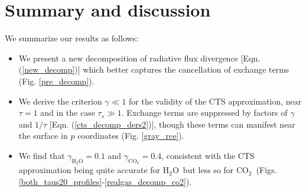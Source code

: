 \documentclass{ametsoc}
\newcommand{\eqnref}[1]{(\ref{#1})}
\newcommand{\cotwo}{\ensuremath{\mathrm{CO_2}}}
\newcommand{\htwo}{\ensuremath{\mathrm{H_2O}}}
\newcommand{\ch}{\ensuremath{\mathcal{H}}}
\newcommand{\chk}{\ensuremath{\ch_k}}
\newcommand{\tauk}{\ensuremath{\tau_k}}
\newcommand{\taus}{\ensuremath{\tau_s}}
\begin{document}

\section{Summary and discussion} \label{sec_summary}
We summarize our results as follows:
\begin{itemize}
	\item We present a new decomposition of radiative flux divergence [Eqn. \eqnref{new_decomp}] which better captures the cancellation of exchange terms (Fig. \ref{pre_decomp}).
	\item We derive the criterion $\gamma \ll 1$ for the validity of the CTS approximation, near $\tau=1$ and in the case $\taus \gg 1$. Exchange terms are suppressed by factors of $\gamma$ and $1/\tau$ [Eqn. \eqnref{cts_decomp_ders2}], though these terms can manifest near the surface in $p$ coordinates (Fig. \ref{gray_rce}).
	\item  We find that  $\gamma_{\htwo}  =  0.1$  and $\gamma_{\cotwo}  =  0.4$, consistent with the CTS approximation being quite accurate for \htwo\ but less so for \cotwo\ (Figs. \ref{both_taus20_profiles}-\ref{realgas_decomp_co2}).
\end{itemize}
\end{document}
